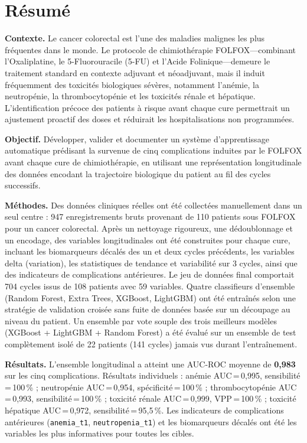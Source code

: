\documentclass[12pt,a4paper]{report}
\begin{document}
\chapter*{Résumé}

\noindent\textbf{Contexte.}
Le cancer colorectal est l'une des maladies malignes les plus fréquentes dans le monde. Le protocole de chimiothérapie FOLFOX---combinant l'Oxaliplatine, le 5-Fluorouracile (5-FU) et l'Acide Folinique---demeure le traitement standard en contexte adjuvant et néoadjuvant, mais il induit fréquemment des toxicités biologiques sévères, notamment l'anémie, la neutropénie, la thrombocytopénie et les toxicités rénale et hépatique. L'identification précoce des patients à risque avant chaque cure permettrait un ajustement proactif des doses et réduirait les hospitalisations non programmées.

\vspace{0.5em}
\noindent\textbf{Objectif.}
Développer, valider et documenter un système d'apprentissage automatique prédisant la survenue de cinq complications induites par le FOLFOX avant chaque cure de chimiothérapie, en utilisant une représentation longitudinale des données encodant la trajectoire biologique du patient au fil des cycles successifs.

\vspace{0.5em}
\noindent\textbf{Méthodes.}
Des données cliniques réelles ont été collectées manuellement dans un seul centre : 947 enregistrements bruts provenant de 110 patients sous FOLFOX pour un cancer colorectal. Après un nettoyage rigoureux, une dédoublonnage et un encodage, des variables longitudinales ont été construites pour chaque cure, incluant les biomarqueurs décalés des un et deux cycles précédents, les variables delta (variation), les statistiques de tendance et variabilité sur 3 cycles, ainsi que des indicateurs de complications antérieures. Le jeu de données final comportait 704 cycles issus de 108 patients avec 59 variables. Quatre classifieurs d'ensemble (Random Forest, Extra Trees, XGBoost, LightGBM) ont été entraînés selon une stratégie de validation croisée sans fuite de données basée sur un découpage au niveau du patient. Un ensemble par vote souple des trois meilleurs modèles (XGBoost + LightGBM + Random Forest) a été évalué sur un ensemble de test complètement isolé de 22 patients (141 cycles) jamais vus durant l'entraînement.

\vspace{0.5em}
\noindent\textbf{Résultats.}
L'ensemble longitudinal a atteint une AUC-ROC moyenne de \textbf{0,983} sur les cinq complications. Résultats individuels : anémie AUC\,=\,0,995, sensibilité\,=\,100\,\% ; neutropénie AUC\,=\,0,954, spécificité\,=\,100\,\% ; thrombocytopénie AUC\,=\,0,993, sensibilité\,=\,100\,\% ; toxicité rénale AUC\,=\,0,999, VPP\,=\,100\,\% ; toxicité hépatique AUC\,=\,0,972, sensibilité\,=\,95,5\,\%. Les indicateurs de complications antérieures ({\tt anemia\_t1}, {\tt neutropenia\_t1}) et les biomarqueurs décalés ont été les variables les plus informatives pour toutes les cibles.
\end{document}
